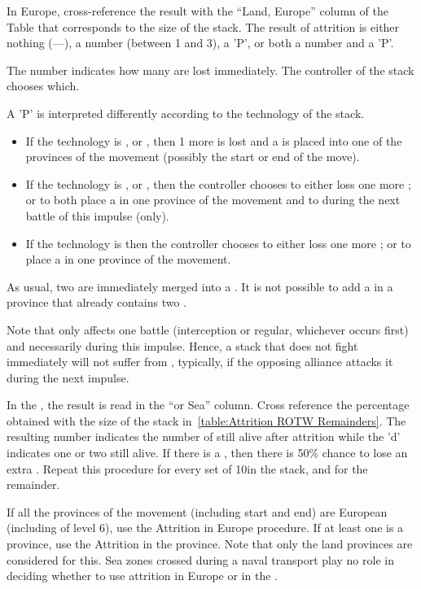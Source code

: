 In Europe, cross-reference the result with the ``Land, Europe'' column of the
Table that corresponds to the size of the stack. The result of attrition is
either nothing (---), a number (between 1 and 3), a 'P', or both a number and
a 'P'.

The number indicates how many \LD are lost immediately. The controller of the
stack chooses which.

A 'P' is interpreted differently according to the technology of the stack.
\begin{itemize}
\item If the technology is \TMED, \TREN or \TARQ, then 1 more \LD is lost and
  a \PILLAGE\facemoins is placed into one of the provinces of the movement
  (possibly the start or end of the move).
\item If the technology is \TMUS, \TBAR or \TMAN, then the controller chooses
  to either loss one more \LD; or to both place a \PILLAGE\facemoins in one
  province of the movement and to  during the next battle of
  this impulse (only).
\item If the technology is \TL then the controller chooses
  to either loss one more \LD; or to place a \PILLAGE\facemoins in one
  province of the movement.
\end{itemize}
As usual, two \PILLAGE\Facemoins are immediately merged into a
\PILLAGE\Faceplus. It is not possible to add a \PILLAGE in a province that
already contains two \PILLAGE\Faceplus.

Note that  only affects one battle (interception or regular,
whichever occurs first) and necessarily during this impulse. Hence, a stack
that does not fight immediately will not suffer from ,
typically, if the opposing alliance attacks it during the next impulse.

\smallskip

In the \ROTW, the result is read in the ``\ROTW or Sea'' column. Cross
reference the percentage obtained with the size of the stack
in~\ref{table:Attrition ROTW Remainders}. The resulting number indicates the
number of \LD still alive after attrition while the 'd' indicates one or two
\LDE still alive. If there is a \textetoile, then there is 50\% chance to lose
an extra \LDE. Repeat this procedure for every set of 10\LD in the stack, and
for the remainder.

If all the provinces of the movement (including start and end) are European
(including \COL of level 6), use the Attrition in Europe procedure. If at
least one is a \ROTW province, use the Attrition in the \ROTW province. Note
that only the land provinces are considered for this. Sea zones crossed during
a naval transport play no role in deciding whether to use attrition in Europe
or in the \ROTW.

